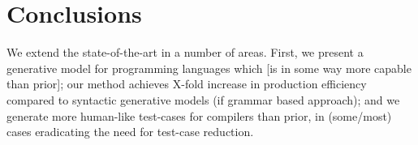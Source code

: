 \section{Conclusions}\label{sec:conclusion}

We extend the state-of-the-art in a number of areas. First, we present a generative model for programming languages which [is in some way more capable than prior];
%
our method achieves X-fold increase in production efficiency compared to syntactic generative models (if grammar based approach);
%
and we generate more human-like test-cases for compilers than prior, in (some/most) cases eradicating the need for test-case reduction.